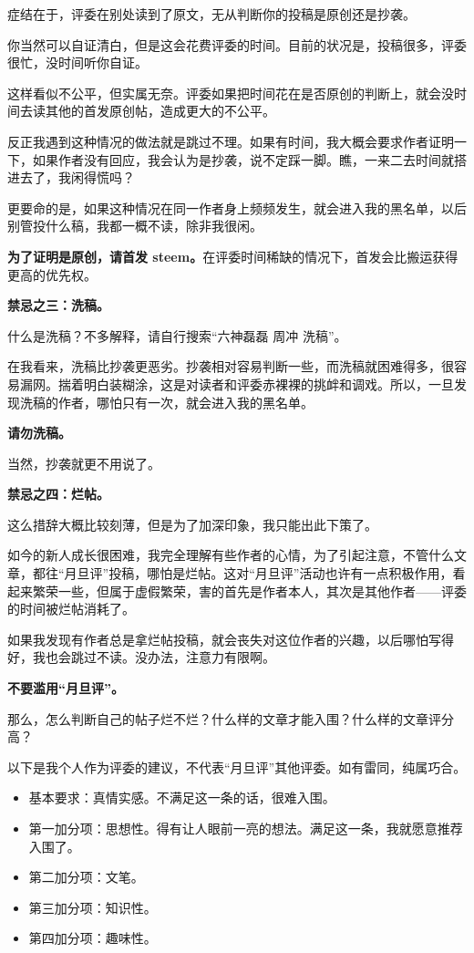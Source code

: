 \documentclass[]{ctexbook}
\providecommand{\tightlist}{%
  \setlength{\itemsep}{0pt}\setlength{\parskip}{0pt}}
\begin{document}
症结在于，评委在别处读到了原文，无从判断你的投稿是原创还是抄袭。

你当然可以自证清白，但是这会花费评委的时间。目前的状况是，投稿很多，评委很忙，没时间听你自证。

这样看似不公平，但实属无奈。评委如果把时间花在是否原创的判断上，就会没时间去读其他的首发原创帖，造成更大的不公平。

反正我遇到这种情况的做法就是跳过不理。如果有时间，我大概会要求作者证明一下，如果作者没有回应，我会认为是抄袭，说不定踩一脚。瞧，一来二去时间就搭进去了，我闲得慌吗？

更要命的是，如果这种情况在同一作者身上频频发生，就会进入我的黑名单，以后别管投什么稿，我都一概不读，除非我很闲。

\textbf{为了证明是原创，请首发 steem。}在评委时间稀缺的情况下，首发会比搬运获得更高的优先权。

\textbf{禁忌之三：洗稿。}

什么是洗稿？不多解释，请自行搜索``六神磊磊 周冲 洗稿''。

在我看来，洗稿比抄袭更恶劣。抄袭相对容易判断一些，而洗稿就困难得多，很容易漏网。揣着明白装糊涂，这是对读者和评委赤裸裸的挑衅和调戏。所以，一旦发现洗稿的作者，哪怕只有一次，就会进入我的黑名单。

\textbf{请勿洗稿。}

当然，抄袭就更不用说了。

\textbf{禁忌之四：烂帖。}

这么措辞大概比较刻薄，但是为了加深印象，我只能出此下策了。

如今的新人成长很困难，我完全理解有些作者的心情，为了引起注意，不管什么文章，都往``月旦评''投稿，哪怕是烂帖。这对``月旦评''活动也许有一点积极作用，看起来繁荣一些，但属于虚假繁荣，害的首先是作者本人，其次是其他作者------评委的时间被烂帖消耗了。

如果我发现有作者总是拿烂帖投稿，就会丧失对这位作者的兴趣，以后哪怕写得好，我也会跳过不读。没办法，注意力有限啊。

\textbf{不要滥用``月旦评''。}

那么，怎么判断自己的帖子烂不烂？什么样的文章才能入围？什么样的文章评分高？

以下是我个人作为评委的建议，不代表``月旦评''其他评委。如有雷同，纯属巧合。

\begin{itemize}
\tightlist
\item
  基本要求：真情实感。不满足这一条的话，很难入围。
\item
  第一加分项：思想性。得有让人眼前一亮的想法。满足这一条，我就愿意推荐入围了。
\item
  第二加分项：文笔。
\item
  第三加分项：知识性。
\item
  第四加分项：趣味性。
\end{itemize}
\end{document}
